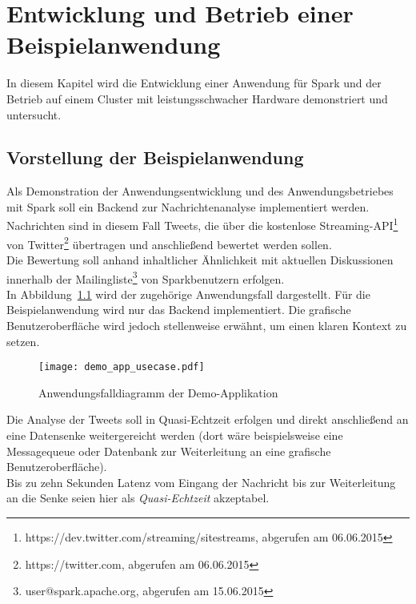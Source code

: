 \chapter{Entwicklung und Betrieb einer Beispielanwendung}

In diesem Kapitel wird die Entwicklung einer Anwendung für Spark und der Betrieb auf einem Cluster mit leistungsschwacher Hardware demonstriert und untersucht.

\section{Vorstellung der Beispielanwendung}

Als Demonstration der Anwendungsentwicklung und des Anwendungsbetriebes mit Spark soll ein Backend zur Nachrichtenanalyse implementiert werden.\\
Nachrichten sind in diesem Fall Tweets, die über die kostenlose Streaming-\gls{API}\footnote{https://dev.twitter.com/streaming/sitestreams, abgerufen am 06.06.2015} von Twitter\footnote{https://twitter.com, abgerufen am 06.06.2015} übertragen  und anschließend bewertet werden sollen.\\
Die Bewertung soll anhand inhaltlicher Ähnlichkeit mit aktuellen Diskussionen innerhalb der Mailingliste\footnote{user@spark.apache.org, abgerufen am 15.06.2015} von Sparkbenutzern erfolgen.\\

In Abbildung~\ref{figure:demo_app_usecase} wird der zugehörige Anwendungsfall dargestellt. Für die Beispielanwendung wird nur das Backend implementiert. Die grafische Benutzeroberfläche wird jedoch stellenweise erwähnt, um einen klaren Kontext zu setzen.\\

\begin{figure}[ht!]
	\centering
  \texttt{[image: demo\_app\_usecase.pdf]}
	\caption{Anwendungsfalldiagramm der Demo-Applikation}
	\label{figure:demo_app_usecase}
\end{figure}

Die Analyse der Tweets soll in Quasi-Echtzeit erfolgen und direkt anschließend an eine Datensenke weitergereicht werden (dort wäre beispielsweise eine Messagequeue oder Datenbank zur Weiterleitung an eine grafische Benutzeroberfläche).\\
Bis zu zehn Sekunden Latenz vom Eingang der Nachricht bis zur Weiterleitung an die Senke seien hier als \textit{Quasi-Echtzeit} akzeptabel.\\

